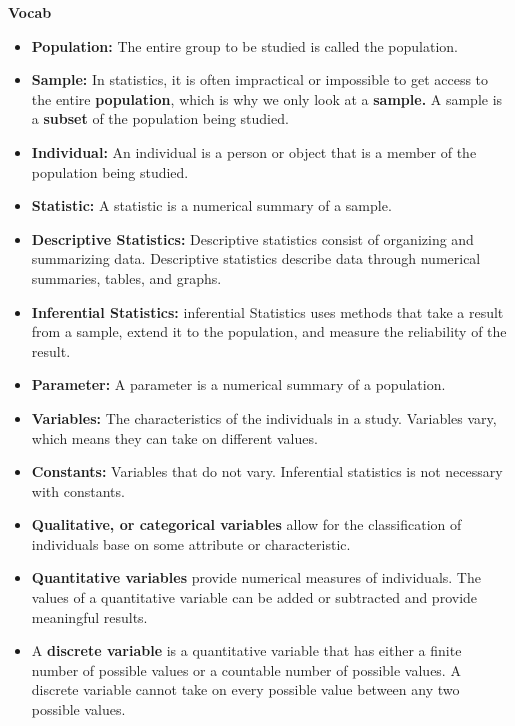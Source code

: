 \documentclass{report}
\begin{document}
        \pagebreak \bigbreak \noindent
      \begin{large}
        \textbf{Vocab}
      \end{large}
    \begin{itemize}
        \item \textbf{Population:} The entire group to be studied is called the population.
        \item \textbf{Sample:} In statistics, it is often impractical or impossible to get access to the entire \textbf{population}, which is why we only look at a \textbf{sample.} A sample is a \textbf{subset} of the population being studied.
        \item \textbf{Individual:} An individual is a person or object that is a member of the population being studied.
        \item \textbf{Statistic:} A statistic is a numerical summary of a sample.
        \item \textbf{Descriptive Statistics:} Descriptive statistics consist of organizing and summarizing data. Descriptive statistics describe data through numerical summaries, tables, and graphs.
        \item \textbf{Inferential Statistics:} inferential Statistics uses methods that take a result from a sample, extend it to the population, and measure the reliability of the result.
        \item \textbf{Parameter:} A parameter is a numerical summary of a population.
        \item \textbf{Variables:} The characteristics of the individuals in a study. Variables vary, which means they can take on different values.
        \item \textbf{Constants:} Variables that do not vary. Inferential statistics is not necessary with constants.
        \item \textbf{Qualitative, or categorical variables} allow for the classification of individuals base on some attribute or characteristic.
        \item \textbf{Quantitative variables} provide numerical measures of individuals. The values of a quantitative variable can be added or subtracted and provide meaningful results.
        \item A \textbf{discrete variable} is a quantitative variable that has either a finite number of possible values or a countable number of possible values. A discrete variable cannot take on every possible value between any two possible values.

\end{itemize}
\end{document}
